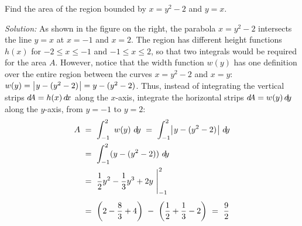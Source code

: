 \begin{exmp}\label{exmp:areacurves5}
\noindent Find the area of the region bounded by $x=y^2-2$ and $y=x$.
\par\noindent\emph{Solution:} As shown in the figure on the right, the parabola
$x=y^2-2$ intersects the line $y=x$ at $x=-1$ and $x=2$. The region has different
height functions $h(x)$ for $-2 \le x \le -1$ and $-1 \le x \le 2$, so that two
integrals would be required for the area $A$. However, notice that the width
function $w(y)$ has one definition over the entire region between the curves
$x=y^2-2$ and $x=y$: $w(y) = \bigl\lvert\mspace{1mu}y - (y^2-2)\mspace{1mu}\bigr\rvert = y - (y^2 -2)$. Thus, instead of
integrating the vertical strips $d\negmedspace A = h(x)\,d\!x$ along the
$x$-axis, integrate the horizontal strips $d\negmedspace A = w(y)\,d\!y$ along the $y$-axis,
from $y=-1$ to $y=2$:
\begin{align*}
A ~&=~ \int_{-1}^2~w(y)~d\!y ~=~ \int_{-1}^2\bigl\lvert\mspace{1mu}y - (y^2 - 2)\mspace{1mu}\bigr\rvert~d\!y\\
&=~ \int_{-1}^2 (y - (y^2 - 2))~d\!y\\
&=~ \frac{1}{2}y^2 - \frac{1}{3}y^3 + 2y~\Biggr|_{-1}^{2}\\[4pt]
&=~ \left(2 - \frac{8}{3} + 4\right) ~-~ \left(\frac{1}{2} + \frac{1}{3} - 2\right)
~=~ \frac{9}{2}
\end{align*}
\end{exmp}
\divider
\newpage
